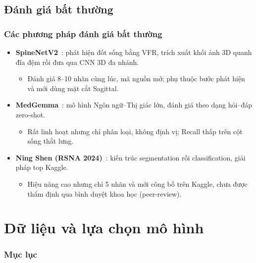 \documentclass{beamer}
\numberwithin{figure}{section}
\numberwithin{table}{section}
\begin{document}
\subsection{Đánh giá bất thường}
\begin{frame}
\frametitle{Các phương pháp đánh giá bất thường}
\begin{itemize}
    \item[--] \textbf{SpineNetV2}~\cite{windsor2022spinenetv2}: phát hiện đốt sống bằng VFR, trích xuất khối ảnh 3D quanh đĩa đệm rồi đưa qua CNN 3D đa nhánh.
    \begin{itemize}\item[$\circ$] Đánh giá 8--10 nhãn cùng lúc, mã nguồn mở; phụ thuộc bước phát hiện và mới dùng mặt cắt Sagittal.\end{itemize}
    \pause
    \item[--] \textbf{MedGemma}~\cite{google2025medgemma}: mô hình Ngôn ngữ--Thị giác lớn, đánh giá theo dạng hỏi--đáp zero-shot.
    \begin{itemize}\item[$\circ$] Rất linh hoạt nhưng chỉ phân loại, không định vị; Recall thấp trên cột sống thắt lưng.\end{itemize}
    \pause
    \item[--] \textbf{Ning Shen (RSNA 2024)}~\cite{nshen7_rsna2024}: kiến trúc segmentation rồi classification, giải pháp top Kaggle.
    \begin{itemize}\item[$\circ$] Hiệu năng cao nhưng chỉ 5 nhãn và mới công bố trên Kaggle, chưa được thẩm định qua bình duyệt khoa học (peer-review).\end{itemize}
\end{itemize}
\end{frame}

\section{Dữ liệu và lựa chọn mô hình}
{
    \begin{frame}
        \frametitle{Mục lục}
    \end{frame}
}
\end{document}
